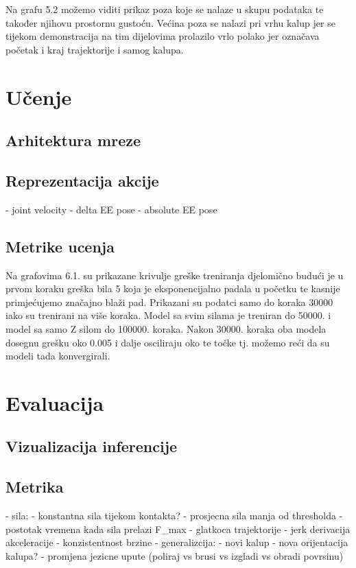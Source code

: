 \documentclass[times, utf8, diplomski]{fer}
\begin{document}
Na grafu 5.2 možemo viditi prikaz poza koje se nalaze u skupu podataka te također njihovu prostornu gustoću. Većina poza se nalazi pri vrhu kalup jer se tijekom demonstracija na tim dijelovima prolazilo vrlo polako jer označava početak i kraj trajektorije i samog kalupa.

\chapter{Učenje}

\section{Arhitektura mreze}
\section{Reprezentacija akcije}
- joint velocity
- delta EE pose
- absolute EE pose

\section{Metrike ucenja}

Na grafovima 6.1. su prikazane krivulje greške treniranja djelomično budući je u prvom koraku greška bila 5 koja je eksponencijalno padala u početku te kasnije primjećujemo značajno blaži pad. Prikazani su podatci samo do koraka 30000 iako su trenirani na više koraka. Model sa svim silama je treniran do 50000. i model sa samo Z silom do 100000. koraka. Nakon 30000. koraka oba modela dosegnu grešku oko 0.005 i dalje osciliraju oko te točke tj. možemo reći da su modeli tada konvergirali.

\chapter{Evaluacija}

\section{Vizualizacija inferencije}



\section{Metrika}
- sila:
    - konstantna sila tijekom kontakta?
    - prosjecna sila manja od thresholda
    - postotak vremena kada sila prelazi F\_max
    - glatkoca trajektorije - jerk derivacija akceleracije
    - konzistentnost brzine
- generalizcija:
    - novi kalup
    - nova orijentacija kalupa?
    - promjena jezicne upute (poliraj vs brusi vs izgladi vs obradi povrsinu)
\end{document}
